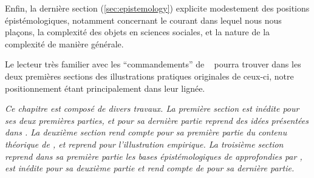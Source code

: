 Enfin, la dernière section (\ref{sec:epistemology}) explicite modestement des positions épistémologiques, notamment concernant le courant dans lequel nous nous plaçons, la complexité des objets en sciences sociales, et la nature de la complexité de manière générale.

Le lecteur très familier avec les ``commandements'' de ~\cite{banos2013pour} pourra trouver dans les deux premières sections des illustrations pratiques originales de ceux-ci, notre positionnement étant principalement dans leur lignée.



\stars


\textit{Ce chapitre est composé de divers travaux. La première section est inédite pour ses deux premières parties, et pour sa dernière partie reprend des idées présentées dans \cite{cottineau2017initial}. La deuxième section rend compte pour sa première partie du contenu théorique de \cite{raimbault2016cautious}, et reprend \cite{raimbault2017investigating} pour l'illustration empirique. La troisième section reprend dans sa première partie les bases épistémologiques de \cite{raimbault:halshs-01505084} approfondies par \cite{raimbault2017applied}, est inédite pour sa deuxième partie et rend compte de \cite{raimbault2017complex} pour sa dernière partie.
}






